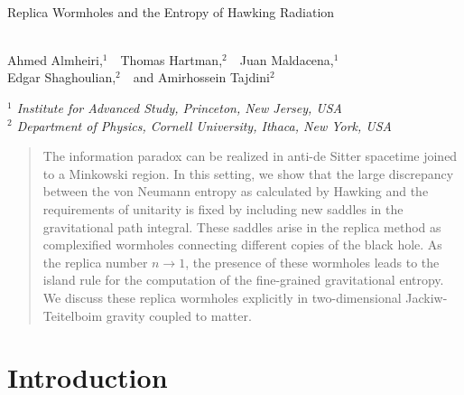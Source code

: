\documentclass[11pt,oneside]{article}
\numberwithin{equation}{section}
\begin{document}
\begin{center}

~
\vskip5mm

{\LARGE  {
Replica Wormholes and the Entropy of Hawking Radiation \\
\ \\
}}

\vskip10mm

Ahmed Almheiri,$^1$\ \ Thomas Hartman,$^{2}$\ \ Juan Maldacena,$^{1}$\\  Edgar Shaghoulian,$^{2}$\ \  and Amirhossein Tajdini$^{2}$

\vskip5mm

{\it $^1$ Institute for Advanced Study, Princeton, New Jersey, USA } \\
\vskip5mm
{\it $^2$ Department of Physics, Cornell University, Ithaca, New York, USA
} 

\vskip5mm





\end{center}

\vspace{4mm}

\begin{abstract}
\noindent

The information paradox can be realized in anti-de Sitter spacetime joined to a Minkowski region. In this setting, we show that the large discrepancy between the von Neumann entropy as calculated by Hawking and the requirements of unitarity is fixed by including new saddles in the gravitational path integral. These saddles arise in the replica method as complexified wormholes connecting different copies of the black hole. As the replica number $n \to 1$, the presence of these wormholes leads to the island rule for the computation of the fine-grained gravitational entropy. 
We discuss these replica wormholes explicitly in two-dimensional Jackiw-Teitelboim gravity coupled to matter. 

 
 \end{abstract}


\pagebreak
\pagestyle{plain}

\setcounter{tocdepth}{2}
{}
\vfill
\tableofcontents

\newpage

\section{Introduction}
\end{document}

